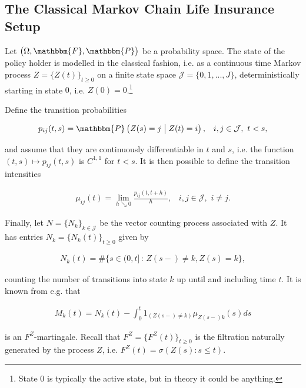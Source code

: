 \documentclass{article}
\newcommand{\1}[1]{\mathbbm{1}_{\left\lbrace #1 \right\rbrace}}
\theoremstyle{break}
\theoremstyle{remark}
\numberwithin{equation}{section}
\begin{document}
\subsection{The Classical Markov Chain Life Insurance Setup}

Let $\left( \Omega, \mathbbm{F}, \mathbbm{P} \right)$ be a probability space. The state of the policy holder is modelled in the classical fashion, i.e. as a continuous time Markov process $Z = \{ Z(t) \}_{t \geq 0}$ on a finite state space $\mathcal{J}= \{ 0, 1, ..., J \} $, deterministically starting in state $0$, i.e. $Z(0) = 0$.\footnote{State 0 is typically the active state, but in theory it could be anything.}

Define the transition probabilities

\begin{align*}
    p_{ij}(t,s) =  \mathbbm{P} \left( Z(s)=j \;\middle\vert\; Z(t)=i \right), \, \, \, \, \, i,j \in \mathcal{J}, \, \, t < s,
\end{align*}

and assume that they are continuously differentiable in $t$ and $s$, i.e. the function $(t,s) \mapsto p_{ij}(t,s)$ is $C^{1,1}$ for $t < s$. It is then possible to define the transition intensities

\begin{align*}
    \mu_{ij}(t) = \lim_{h \searrow 0} \frac{p_{ij} \left( t,t+h \right)}{h}, \, \, \, \, \, i,j \in \mathcal{J}, \, \, i \neq j.
\end{align*}

Finally, let $N = \{ N_{k} \}_{k \in \mathcal{J}}$ be the vector counting process associated with $Z$. It has entries $N_{k} = \{ N_{k}(t) \}_{t \geq 0}$ given by

\begin{align*}
    N_{k}(t) = \# \{ s \in (0,t] \, : \, Z(s-) \neq k, Z(s)=k \},
\end{align*}

counting the number of transitions into state $k$ up until and including time $t$. It is known from e.g. \cite{LivStok} that

\begin{align*}
    M_{k}(t) = N_{k}(t) - \int_0^t 1_{( Z(s-) \neq k)} \mu_{Z(s-)k}(s)ds
\end{align*}

is an $F^Z$-martingale. Recall that $F^Z= \{ F^Z(t) \}_{t \geq 0}$ is the filtration naturally generated by the process $Z$, i.e. $F^Z(t) = \sigma(Z(s) : s \leq t)$.
\end{document}
